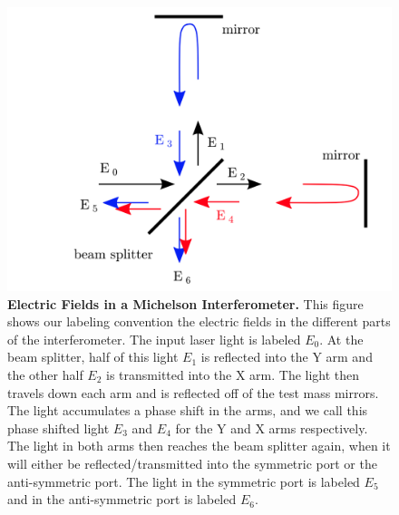 \documentclass[11pt]{cuthesis}
\begin{document}
\begin{figure}[ht]
\centering
\includegraphics[width=12cm]{electric_fields} 
\caption{\textbf{Electric Fields in a Michelson Interferometer.} This figure shows our labeling convention the electric fields in the different parts of the interferometer. The input laser light is labeled $E_0$. At the beam splitter, half of this light $E_1$ is reflected into the Y arm and the other half  $E_2$ is transmitted into the X arm. The light then travels down each arm and is reflected off of the test mass mirrors. The light accumulates a phase shift in the arms, and we call this phase shifted light $E_3$ and $E_4$ for the Y and X arms respectively. The light in both arms then reaches the beam splitter again, when it will either be reflected/transmitted into the symmetric port or the anti-symmetric port. The light in the symmetric port is labeled $E_5$ and in the anti-symmetric port is labeled $E_6$. \cite{ifo_tech} }
\label{fig:ef}
\end{figure} 
\end{document}
